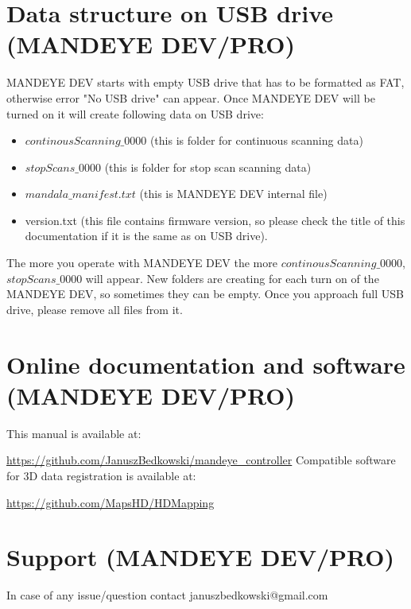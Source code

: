 \section{Data structure on USB drive (MANDEYE DEV/PRO)}
MANDEYE DEV starts with empty USB drive that has to be formatted as FAT, otherwise error "No USB drive" can appear.
Once MANDEYE DEV will be turned on it will create following data on USB drive:
\begin{itemize}
	\item $continousScanning\_0000$ (this is folder for continuous scanning data)
	\item $stopScans\_0000$ (this is folder for stop scan scanning data)
	\item $mandala\_manifest.txt$ (this is MANDEYE DEV internal file)
	\item version.txt (this file contains firmware version, so please check the title of this documentation if it is the same as on USB drive).
\end{itemize}
The more you operate with MANDEYE DEV the more $continousScanning\_0000$, $stopScans\_0000$ will appear. New folders are creating for each turn on of the MANDEYE DEV, so sometimes they can be empty.
Once you approach full USB drive, please remove all files from it.

\section{Online documentation and software (MANDEYE DEV/PRO)}

This manual is available at:

\url{https://github.com/JanuszBedkowski/mandeye_controller} \newline
Compatible software for 3D data registration is available at:

\url{https://github.com/MapsHD/HDMapping}

\section{Support (MANDEYE DEV/PRO)}
In case of any issue/question contact januszbedkowski@gmail.com

